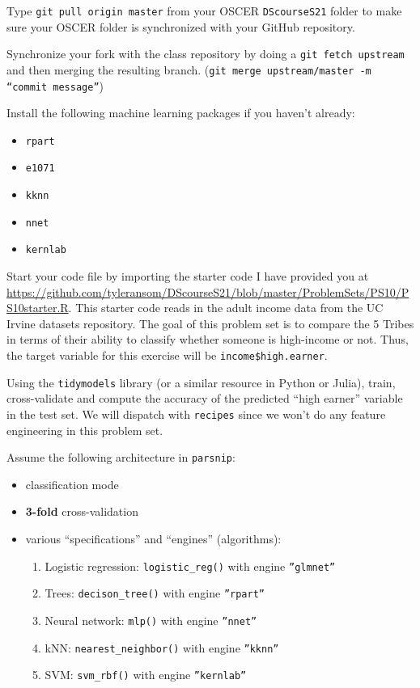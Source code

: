 \documentclass[12pt,english]{exam}
\begin{document}
\begin{questions}
\question Type \texttt{git pull origin master} from your OSCER \texttt{DScourseS21} folder to make sure your OSCER folder is synchronized with your GitHub repository. 

\question Synchronize your fork with the class repository by doing a \texttt{git fetch upstream} and then merging the resulting branch. (\texttt{git merge upstream/master -m ``commit message''})

\question Install the following machine learning packages if you haven't already:
\begin{itemize}
    \item \texttt{rpart}
    \item \texttt{e1071}
    \item \texttt{kknn}
    \item \texttt{nnet}
    \item \texttt{kernlab}
\end{itemize}

\question Start your code file by importing the starter code I have provided you at \url{https://github.com/tyleransom/DScourseS21/blob/master/ProblemSets/PS10/PS10starter.R}. This starter code reads in the adult income data from the UC Irvine datasets repository. The goal of this problem set is to compare the 5 Tribes in terms of their ability to classify whether someone is high-income or not. Thus, the target variable for this exercise will be \texttt{income\$high.earner}. 

\question Using the \texttt{tidymodels} library (or a similar resource in Python or Julia), train, cross-validate and compute the accuracy of the predicted ``high earner'' variable in the test set. We will dispatch with \texttt{recipes} since we won't do any feature engineering in this problem set.

Assume the following architecture in \texttt{parsnip}:

\begin{itemize}
\item classification mode
\item \textbf{3-fold} cross-validation
\item various ``specifications'' and ``engines'' (algorithms):
    \begin{enumerate}
    \item Logistic regression: \texttt{logistic\_reg()} with engine \texttt{''glmnet''}    
    \item Trees: \texttt{decison\_tree()} with engine \texttt{''rpart''}
    \item Neural network: \texttt{mlp()} with engine \texttt{''nnet''}      
    \item kNN: \texttt{nearest\_neighbor()} with engine \texttt{''kknn''}       
    \item SVM: \texttt{svm\_rbf()} with engine \texttt{''kernlab''}       
    \end{enumerate}
\end{itemize}


\end{questions}
\end{document}
